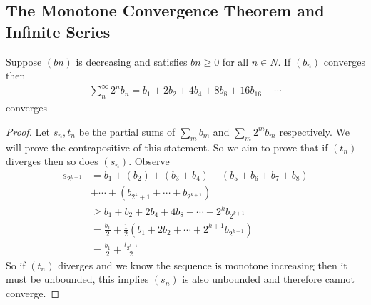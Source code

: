 \subsection{The Monotone Convergence Theorem and Infinite Series}

\begin{theorem}
    Suppose $(bn)$ is decreasing and satisfies $bn \geq 0$ for all $n \in N$. 
    If $(b_n)$ converges then
    \begin{align*}
        \sum_n^\infty 2^n b_n = b_1 + 2b_2 + 4b_4 + 8b_8 + 16b_{16} + \cdots
    \end{align*}
    converges
\end{theorem}
\begin{proof}
    Let $s_n, t_n$ be the partial sums of $\sum_m b_m$ and $\sum_m 2^m b_m$ respectively. 
    We will prove the contrapositive of this statement. So we aim to prove that if 
    $(t_n)$ diverges then so does $(s_n)$.
    Observe
    \begin{align*}
        s_{2^{k+1}} &= b_1 + (b_2) + (b_3 + b_4) + (b_5 + b_6 + b_7 + b_8) \\
        & + \cdots + (b_{2^k+1} + \cdots + b_{2^{k+1}}) \\ 
        &\geq b_1 + b_2 + 2b_4 + 4b_8 + \cdots + 2^{k}b_{2^{k+1}}\\
        &= \frac{b_1}{2} + \frac{1}{2}\left( b_1 + 2b_2 + \cdots + 2^{k+1} b_{2^{k+1}} \right) \\
        &= \frac{b_1}{2} + \frac{t_{2^{k+1}}}{2}
    \end{align*}
    So if $(t_n)$ diverges and we know the sequence is 
    monotone increasing then it must be unbounded, this implies $(s_n)$ is also unbounded
    and therefore cannot converge.
\end{proof}

